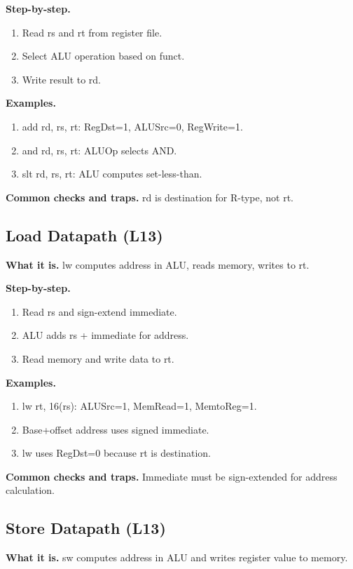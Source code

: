 \documentclass[11pt]{article}
\begin{document}
\textbf{Step-by-step.}
\begin{enumerate}[leftmargin=*]
  \item Read rs and rt from register file.
  \item Select ALU operation based on funct.
  \item Write result to rd.
\end{enumerate}

\textbf{Examples.}
\begin{enumerate}[leftmargin=*]
  \item add rd, rs, rt: RegDst=1, ALUSrc=0, RegWrite=1.
  \item and rd, rs, rt: ALUOp selects AND.
  \item slt rd, rs, rt: ALU computes set-less-than.
\end{enumerate}

\textbf{Common checks and traps.} rd is destination for R-type, not rt.

\subsection{Load Datapath (L13)}
\textbf{What it is.} lw computes address in ALU, reads memory, writes to rt.

\textbf{Step-by-step.}
\begin{enumerate}[leftmargin=*]
  \item Read rs and sign-extend immediate.
  \item ALU adds rs + immediate for address.
  \item Read memory and write data to rt.
\end{enumerate}

\textbf{Examples.}
\begin{enumerate}[leftmargin=*]
  \item lw rt, 16(rs): ALUSrc=1, MemRead=1, MemtoReg=1.
  \item Base+offset address uses signed immediate.
  \item lw uses RegDst=0 because rt is destination.
\end{enumerate}

\textbf{Common checks and traps.} Immediate must be sign-extended for address calculation.

\subsection{Store Datapath (L13)}
\textbf{What it is.} sw computes address in ALU and writes register value to memory.
\end{document}
